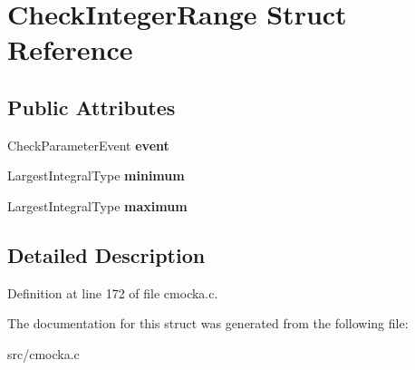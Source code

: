 \hypertarget{structCheckIntegerRange}{}\section{Check\+Integer\+Range Struct Reference}
\label{structCheckIntegerRange}
\subsection*{Public Attributes}
\begin{DoxyCompactItemize}
\item 
\mbox{\label{structCheckIntegerRange_a143da2245bf12c28ebc8521e8925d98c}} 
Check\+Parameter\+Event {\bfseries event}
\item 
\mbox{\label{structCheckIntegerRange_afcc266d34a957220d9d2a202c67290ff}} 
Largest\+Integral\+Type {\bfseries minimum}
\item 
\mbox{\label{structCheckIntegerRange_a61124c5298a3b1542422125446ef3db1}} 
Largest\+Integral\+Type {\bfseries maximum}
\end{DoxyCompactItemize}


\subsection{Detailed Description}


Definition at line 172 of file cmocka.\+c.



The documentation for this struct was generated from the following file\+:\begin{DoxyCompactItemize}
\item 
src/cmocka.\+c\end{DoxyCompactItemize}
